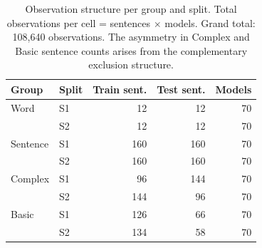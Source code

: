 \begin{table}[t]
\centering\small
\begin{tabular}{@{}llrrr@{}}
\toprule
\textbf{Group} & \textbf{Split} & \textbf{Train sent.} & \textbf{Test sent.} & \textbf{Models} \\
\midrule
Word & S1 & 12 & 12 & 70 \\
 & S2 & 12 & 12 & 70 \\
\addlinespace
Sentence & S1 & 160 & 160 & 70 \\
 & S2 & 160 & 160 & 70 \\
\addlinespace
Complex & S1 & 96 & 144 & 70 \\
 & S2 & 144 & 96 & 70 \\
\addlinespace
Basic & S1 & 126 & 66 & 70 \\
 & S2 & 134 & 58 & 70 \\
\bottomrule
\end{tabular}
\caption{\small Observation structure per group and split. Total observations per cell = sentences $\times$ models. Grand total: 108,640 observations. The asymmetry in Complex and Basic sentence counts arises from the complementary exclusion structure.}
\label{tab:obs_counts}
\end{table}
